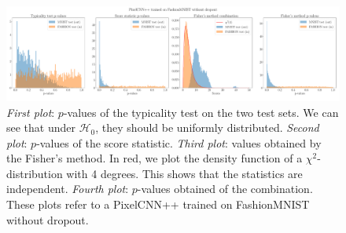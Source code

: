 {\begin{figure}[tbp]
    \includegraphics[width=\textwidth]{graphics/paper_modelagnostic/pvalues_comb_no_drop_correct_font.pdf}
    \caption[Distribution of the p-values of the typicality test, score statistic, Fisher's method and a combination of all.]{\emph{First plot}: $p$-values of the typicality test on the two test sets. We can see that under $\mathcal{H}_0$, they should be uniformly distributed. \emph{Second plot}: $p$-values of the score statistic. \emph{Third plot}: values obtained by the Fisher's method. In red, we plot the density function of a $\chi^2$-distribution with 4 degrees. This shows that the statistics are independent. \emph{Fourth plot}: $p$-values obtained of the combination. These plots refer to a PixelCNN++ trained on FashionMNIST without dropout.}
    \label{fig_modelagnostic:comb_p_values}
\end{figure} 

}

